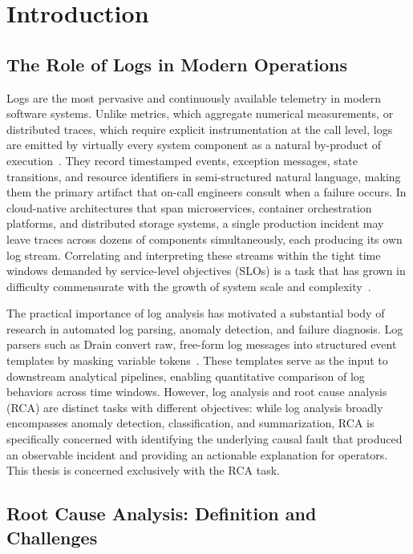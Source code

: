 
\chapter{Introduction}

\section{The Role of Logs in Modern Operations}

Logs are the most pervasive and continuously available telemetry in modern software systems.
Unlike metrics, which aggregate numerical measurements, or distributed traces, which require
explicit instrumentation at the call level, logs are emitted by virtually every system component
as a natural by-product of execution~\cite{he2020loghub}. They record timestamped events,
exception messages, state transitions, and resource identifiers in semi-structured natural
language, making them the primary artifact that on-call engineers consult when a failure occurs.
In cloud-native architectures that span microservices, container orchestration platforms, and
distributed storage systems, a single production incident may leave traces across dozens of
components simultaneously, each producing its own log stream. Correlating and interpreting these
streams within the tight time windows demanded by service-level objectives (SLOs) is a task that
has grown in difficulty commensurate with the growth of system scale and
complexity~\cite{zhang2024cloudRCAsurvey}.

The practical importance of log analysis has motivated a substantial body of research in automated
log parsing, anomaly detection, and failure diagnosis. Log parsers such as Drain convert raw,
free-form log messages into structured event templates by masking variable
tokens~\cite{he2017drain,zhu2019tools}. These templates serve as the input to downstream analytical
pipelines, enabling quantitative comparison of log behaviors across time windows. However, log
analysis and root cause analysis (RCA) are distinct tasks with different objectives: while log
analysis broadly encompasses anomaly detection, classification, and summarization, RCA is
specifically concerned with identifying the underlying causal fault that produced an observable
incident and providing an actionable explanation for operators. This thesis is concerned
exclusively with the RCA task.

\section{Root Cause Analysis: Definition and Challenges}

